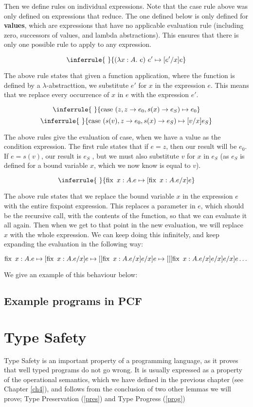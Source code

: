 Then we define rules on individual expressions. Note that the case rule above was only defined on expressions that reduce. The one defined below is only defined for \textbf{values}, which are expressions that have no applicable evaluation rule (including zero, successors of values, and lambda abstractions). This ensures that there is only one possible rule to apply to any expression.



$$
\inferrule{ \ }
 {(\lambda x: A .\ e) \ e' \mapsto [e'/x]e}
$$

The above rule states that given a function application, where the function is defined by a $\lambda$-abstracttion, we substitute $e'$ for $x$ in the expression $e$. This means that we replace every occurrence of $x$ in $e$ with the expression $e'$.

$$
\inferrule{ \ }
{\case \ (z, z \to e_0 , s(x) \to e_S) \mapsto e_0}
$$
$$
\inferrule{ \ }
{\case \ (s(v), z \to e_0 , s(x) \to e_S) \mapsto [v/x]e_S}
$$

The above rules give the evaluation of case, when we have a value as the condition expression. The first rule states that if $e = z$, then our result will be $e_0$. If $e = s(v)$, our result is $e_S$ , but we must also substitute $v$ for $x$ in $e_S$ (as $e_S$ is defined for a bound variable $x$, which we now know is equal to $v$).

$$
\inferrule{ \ }
{\fix \ x:A. e \mapsto [\fix \ x:A. e/x]e}
$$

The above rule states that we replace the bound variable $x$ in the expression $e$ with the entire fixpoint expression. This replaces a parameter in $e$, which should be the recursive call, with the contents of the function, so that we can evaluate it all again. Then when we get to that point in the new evaluation, we will replace $x$ with the whole expression. We can keep doing this infinitely, and keep expanding the evaluation in the following way:

\[ \operatorname{fix} \ x:A. e \mapsto [\operatorname{fix} \ x:A. e/x]e \mapsto 
[[\operatorname{fix} \ x:A. e/x]e/x]e
\mapsto
[[[\operatorname{fix} \ x:A. e/x]e/x]e/x]e \dots \]

We give an example of this behaviour below:

\section{Example programs in PCF}



\chapter{Type Safety}\label{safe}
Type Safety is an important property of a programming language, as it proves that well typed programs do not go wrong. It is usually expressed as a property of the operational semantics, which we have defined in the previous chapter (see Chapter \ref{ch4}), and follows from the conclusion of two other lemmas we will prove; Type Preservation (\ref{pres}) and Type Progress (\ref{prog})

